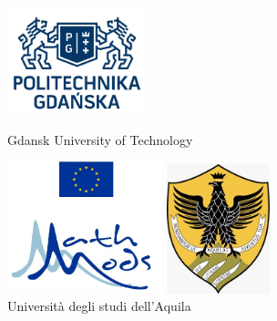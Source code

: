 \documentclass[12pt]{report}
\begin{document}
\setcounter{page}{0}
\thispagestyle{empty}
\captionsetup{justification=centering}
\begin{figure}
    \center
    \includegraphics[width=40mm]{pg_logo}
    \caption*{\footnotesize Gdansk University of Technology}
\endminipage\hfill
{}
    \center
    \includegraphics[width=45mm]{mathmods}
    \caption*{}
\endminipage\hfill
{}%
    \center
    \includegraphics[width=30mm]{laq}
    \caption*{\footnotesize Universit\`a degli studi dell'Aquila}
\endminipage
\end{figure}
\end{document}
